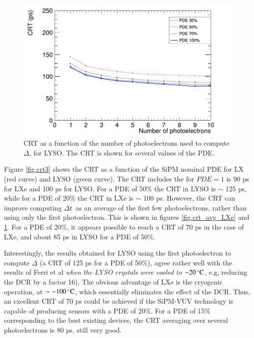 \documentclass[review]{elsarticle}
\begin{document}
 \begin{figure}[!bhtp]
	\centering
	\includegraphics[scale=0.30]{../img/PetaloTOF/lyso_noCher_avg_npe_phys.png}
	\caption{\label{fig.crt_avg_LYSO} CRT as a function of the number of photoelectrons used to compute $\Delta$, for LYSO. The CRT is shown for several values of the PDE.}
\end{figure}

Figure \ref{fig.crt3} shows the CRT as a function of the
 SiPM nominal PDE for LX (red curve) and LYSO (green curve). The CRT includes the
for $PDE=1$ is 90 ps for LXe and 100 ps for LYSO.  For a PDE of 50\% the CRT in LYSO is $\sim$ 125 ps, while for a PDE of 20\%  the CRT in LXe is $\sim$ 100 ps. However, the CRT can improve computing $\Delta t$~as an average of the first few photoelectrons, rather than using only the first photoelectron. This is shown in figures
\ref{fig.crt_avg_LXe} and \ref{fig.crt_avg_LYSO}. For a PDE of 20\%, it appears possible to reach a
CRT of 70 ps in the case of LXe, and about 85 ps in LYSO for a PDE of 50\%.

Interestingly, the results obtained for LYSO using the first photoelectron to compute $\Delta$ (a CRT of 125 ps for a PDE of 50\%), agree rather well with the results of Ferri et al  \cite{LysoFBK} {\em when the LYSO crystals were cooled 
to $-20\,^{\circ}{\rm C}$}, e.g, reducing the DCR by a factor 16). The obvious advantage of LXe is the cryogenic operation, at $\sim -100\,^{\circ}{\rm C}$, which essentially eliminates the effect of the DCR. Thus, an excellent CRT of 70 ps could be achieved if the SiPM-VUV technology is capable of producing sensors with a PDE of 20\%. For a PDE of 15\% corresponding to the best existing devices, the CRT averaging over several photoelectrons is 80 ps, still very good.
\end{document}
